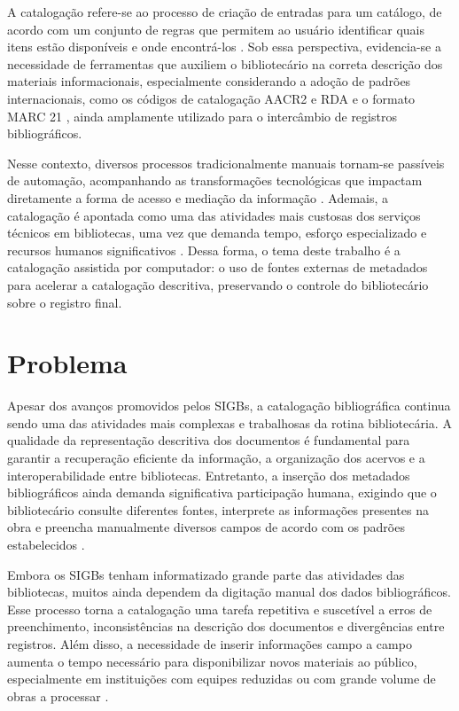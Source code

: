 A catalogação refere-se ao processo de criação de entradas para um catálogo, de acordo com um conjunto de regras que permitem ao usuário identificar quais itens estão disponíveis e onde encontrá-los \cite{raju2006}. Sob essa perspectiva, evidencia-se a necessidade de ferramentas que auxiliem o bibliotecário na correta descrição dos materiais informacionais, especialmente considerando a adoção de padrões internacionais, como os códigos de catalogação AACR2 e RDA e o formato MARC 21 \cite{loc2023}, ainda amplamente utilizado para o intercâmbio de registros bibliográficos.

Nesse contexto, diversos processos tradicionalmente manuais tornam-se passíveis de automação, acompanhando as transformações tecnológicas que impactam diretamente a forma de acesso e mediação da informação \cite{baganha2004}. Ademais, a catalogação é apontada como uma das atividades mais custosas dos serviços técnicos em bibliotecas, uma vez que demanda tempo, esforço especializado e recursos humanos significativos \cite{tauber1954}. Dessa forma, o tema deste trabalho é a catalogação assistida por computador: o uso de fontes externas de metadados para acelerar a catalogação descritiva, preservando o controle do bibliotecário sobre o registro final.

\section{Problema}
\label{sec:problema}

Apesar dos avanços promovidos pelos SIGBs, a catalogação bibliográfica continua sendo uma das atividades mais complexas e trabalhosas da rotina bibliotecária. A qualidade da representação descritiva dos documentos é fundamental para garantir a recuperação eficiente da informação, a organização dos acervos e a interoperabilidade entre bibliotecas. Entretanto, a inserção dos metadados bibliográficos ainda demanda significativa participação humana, exigindo que o bibliotecário consulte diferentes fontes, interprete as informações presentes na obra e preencha manualmente diversos campos de acordo com os padrões estabelecidos \cite{mey2009,oliveira2017}.

Embora os SIGBs tenham informatizado grande parte das atividades das bibliotecas, muitos ainda dependem da digitação manual dos dados bibliográficos. Esse processo torna a catalogação uma tarefa repetitiva e suscetível a erros de preenchimento, inconsistências na descrição dos documentos e divergências entre registros. Além disso, a necessidade de inserir informações campo a campo aumenta o tempo necessário para disponibilizar novos materiais ao público, especialmente em instituições com equipes reduzidas ou com grande volume de obras a processar \cite{cafe2016,lancaster2004}.

